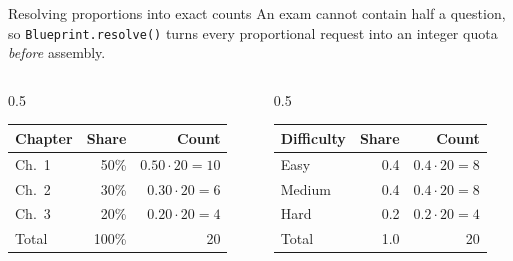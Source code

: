 \documentclass[11pt,aspectratio=169]{beamer}
\newcommand{\code}[1]{\texttt{\small #1}}
\begin{document}
\begin{frame}{Resolving proportions into exact counts}
  An exam cannot contain half a question, so \code{Blueprint.resolve()} turns
  every proportional request into an integer quota \emph{before} assembly.

  \vspace{2mm}
  \begin{columns}[T]
    \begin{column}{0.5\textwidth}
      \centering\footnotesize
      \begin{tabular}{@{}lrr@{}}
        \toprule
        \textbf{Chapter} & \textbf{Share} & \textbf{Count} \\
        \midrule
        Ch.~1 & 50\% & $0.50\cdot20=10$ \\
        Ch.~2 & 30\% & $0.30\cdot20=6$ \\
        Ch.~3 & 20\% & $0.20\cdot20=4$ \\
        \midrule
        Total & 100\% & 20 \\
        \bottomrule
      \end{tabular}
    \end{column}
    \begin{column}{0.5\textwidth}
      \centering\footnotesize
      \begin{tabular}{@{}lrr@{}}
        \toprule
        \textbf{Difficulty} & \textbf{Share} & \textbf{Count} \\
        \midrule
        Easy   & 0.4 & $0.4\cdot20=8$ \\
        Medium & 0.4 & $0.4\cdot20=8$ \\
        Hard   & 0.2 & $0.2\cdot20=4$ \\
        \midrule
        Total & 1.0 & 20 \\
        \bottomrule
      \end{tabular}
    \end{column}
  \end{columns}
\end{frame}
\end{document}
